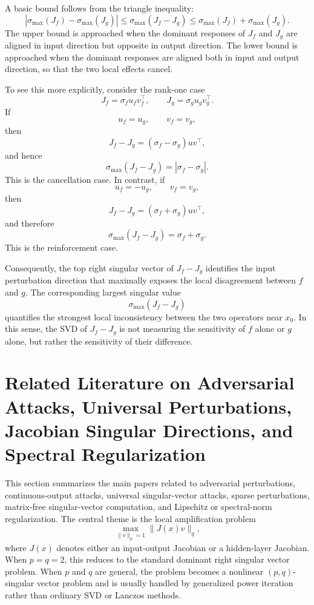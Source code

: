 \documentclass{article}
\begin{document}
A basic bound follows from the triangle inequality:
\[
\left|
\sigma_{\max}(J_f)-\sigma_{\max}(J_g)
\right|
\le
\sigma_{\max}(J_f-J_g)
\le
\sigma_{\max}(J_f)+\sigma_{\max}(J_g).
\]
The upper bound is approached when the dominant responses of \(J_f\) and \(J_g\) are aligned in input direction but opposite in output direction. The lower bound is approached when the dominant responses are aligned both in input and output direction, so that the two local effects cancel.

To see this more explicitly, consider the rank-one case
\[
J_f=\sigma_f u_f v_f^\top,
\qquad
J_g=\sigma_g u_g v_g^\top.
\]
If
\[
u_f=u_g,\qquad v_f=v_g,
\]
then
\[
J_f-J_g=(\sigma_f-\sigma_g)uv^\top,
\]
and hence
\[
\sigma_{\max}(J_f-J_g)=|\sigma_f-\sigma_g|.
\]
This is the cancellation case. In contrast, if
\[
u_f=-u_g,\qquad v_f=v_g,
\]
then
\[
J_f-J_g=(\sigma_f+\sigma_g)uv^\top,
\]
and therefore
\[
\sigma_{\max}(J_f-J_g)=\sigma_f+\sigma_g.
\]
This is the reinforcement case.

Consequently, the top right singular vector of \(J_f-J_g\) identifies the input perturbation direction that maximally exposes the local disagreement between \(f\) and \(g\). The corresponding largest singular value
\[
\sigma_{\max}(J_f-J_g)
\]
quantifies the strongest local inconsistency between the two operators near \(x_0\). In this sense, the SVD of \(J_f-J_g\) is not measuring the sensitivity of \(f\) alone or \(g\) alone, but rather the sensitivity of their difference.

















\section{Related Literature on Adversarial Attacks, Universal Perturbations, Jacobian Singular Directions, and Spectral Regularization}

This section summarizes the main papers related to adversarial perturbations,
continuous-output attacks, universal singular-vector attacks, sparse perturbations,
matrix-free singular-vector computation, and Lipschitz or spectral-norm
regularization. The central theme is the local amplification problem
\[
    \max_{\|v\|_p = 1} \|J(x)v\|_q,
\]
where \(J(x)\) denotes either an input-output Jacobian or a hidden-layer
Jacobian. When \(p=q=2\), this reduces to the standard dominant right singular
vector problem. When \(p\) and \(q\) are general, the problem becomes a nonlinear
\((p,q)\)-singular vector problem and is usually handled by generalized power
iteration rather than ordinary SVD or Lanczos methods.
\end{document}
